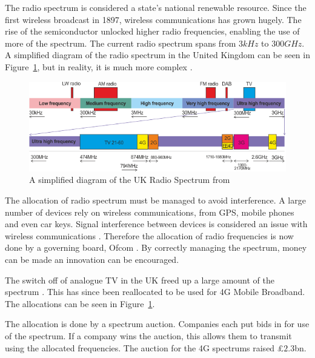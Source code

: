 {}


The radio spectrum is considered a state's national renewable resource.
Since the first wireless broadcast in 1897, wireless communications has grown hugely. %
The rise of the semiconductor unlocked higher radio frequencies, enabling the use of more of the spectrum.
The current radio spectrum spans from $3kHz$ to $300 GHz$. 
A simplified diagram of the radio spectrum in the United Kingdom can be seen in Figure~\ref{c3:ukspectrum}, but in reality, it is much more complex \cite{roke:ukspectrum}.

\begin{figure}
\includegraphics[width=\textwidth]{Figures/radiospectrum.png}
\caption{A simplified diagram of the UK Radio Spectrum from \cite{ukfreetv}}
\label{c3:ukspectrum}
\end{figure}

The allocation of radio spectrum must be managed to avoid interference. 
A large number of devices rely on wireless communications, from GPS, mobile phones and even car keys.
Signal interference between devices is considered an issue with wireless communications \cite{GPS}. 
Therefore the allocation of radio frequencies is now done by a governing board, Ofcom \cite{ofcom:whatis}.
By correctly managing the spectrum, money can be made an innovation can be encouraged.

The switch off of analogue TV in the UK freed up a large amount of the spectrum \cite{ofcom:tv}.
This has since been reallocated to be used for 4G Mobile Broadband.
The allocations can be seen in Figure~\ref{c3:ukspectrum}.

The allocation is done by a spectrum auction.
Companies each put bids in for use of the spectrum. 
If a company wins the auction, this allows them to transmit using the allocated frequencies. 
The auction for the 4G spectrums raised \pounds $2.3$bn. 

